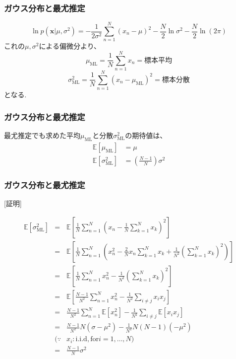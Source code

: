 \documentclass[uplatex,dvipdfmx,11pt,notheorems]{beamer}
\theoremstyle{definition}
\begin{document}
 \begin{frame}\frametitle{ガウス分布と最尤推定}
	$$\ln p\left(\mathbf{x} | \mu, \sigma^{2}\right)=-\frac{1}{2 \sigma^{2}} \sum_{n=1}^{N}\left(x_{n}-\mu\right)^{2}-\frac{N}{2} \ln \sigma^{2}-\frac{N}{2} \ln (2 \pi)$$
	これの$\mu,\sigma^{2}$による偏微分より、
	$$\mu_{\mathrm{ML}}=\frac{1}{N} \sum_{n=1}^{N} x_{n} = \text{標本平均}$$
	$$\sigma_{\mathrm{ML}}^{2}=\frac{1}{N} \sum_{n=1}^{N}\left(x_{n}-\mu_{\mathrm{ML}}\right)^{2} = \text{標本分散}$$
	となる.\\
\end{frame}

 \begin{frame}\frametitle{ガウス分布と最尤推定}
最尤推定でも求めた平均$\mu_{\mathrm{ML}}$と分散$\sigma_{\mathrm{ML}}^{2}$の期待値は、
$$\begin{aligned} \mathbb{E}\left[\mu_{\mathrm{ML}}\right] &=\mu \\ \mathbb{E}\left[\sigma_{\mathrm{ML}}^{2}\right] &=\left(\frac{N-1}{N}\right) \sigma^{2} \end{aligned}$$
\end{frame}

 \begin{frame}\frametitle{ガウス分布と最尤推定}
[証明]
	\begin{scriptsize}
	\begin{eqnarray}
	\mathbb{E}\left[\sigma_{\mathrm{ML}}^{2}\right] &=& \mathbb{E}\left[ \frac{1}{N} \sum_{n=1}^{N}\left(x_{n}-\frac{1}{N} \sum_{k=1}^{N} x_{k}\right)^{2} \right] \\
	&=&  \mathbb{E}\left[ \frac{1}{N} \sum_{n=1}^{N}\left(x_{n}^{2}-\frac{2}{N} x_{n} \sum_{k=1}^{N} x_{k} + \frac{1}{N^{2}} ( \sum_{k=1}^{N} x_{k} )^{2}\right) \right] \\
	&=&  \mathbb{E}\left[ \frac{1}{N} \sum_{n=1}^{N}x_{n}^{2} - \frac{1}{N^{2}} ( \sum_{k=1}^{N} x_{k} )^{2} \right] \\
	&=&  \mathbb{E}\left[ \frac{N-1}{N^{2}} \sum_{n=1}^{N}x_{n}^{2} - \frac{1}{N^{2}}  \sum_{i\neq j} x_{i}x_{j}  \right] \\
	&=&   \frac{N-1}{N^{2}} \sum_{n=1}^{N} \mathbb{E}\left[x_{n}^{2}\right] - \frac{1}{N^{2}}  \sum_{i\neq j}\mathbb{E}\left[ x_{i}x_{j}  \right] \\
	&=&   \frac{N-1}{N^{2}}  N (\sigma-\mu^{2}) - \frac{1}{N^{2}} N(N-1)(-\mu^{2}) \\
	&(\because& x_{i}: \text{i.i.d}, \text{for}  i=1,\dots, N) \\
	&=& \frac{N-1}{N} \sigma^{2} 
	\end{eqnarray}
	\end{scriptsize}
\end{frame}
\end{document}
